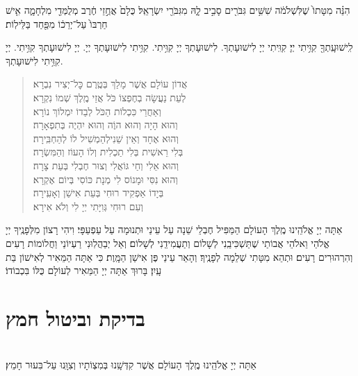 \documentclass[twoside, openany, parskip=half, 11pt]{book}
\begin{document}
הִנֵּ֗ה מִטָּתוֹ֙ שֶׁלִּשְׁלֹמֹ֔ה שִׁשִּׁ֥ים גִּבֹּרִ֖ים סָבִ֣יב לָ֑הּ מִגִּבֹּרֵ֖י יִשְׂרָאֵֽל׃ כֻּלָם֙ אֲחֻ֣זֵי חֶ֔רֶב מְלֻמְּדֵ֖י מִלְחָמָ֑ה אִ֤ישׁ חַרְבּוֹ֙ עַל־יְרֵכ֔וֹ מִפַּ֖חַד בַּלֵּילֽוֹת׃


לִֽישׁוּעָֽתְךָ֖ קִוִּ֥יתִי יְיָ׃ קִוִּֽיתִי יְיָ לִישׁוּעָתְךָ. לִישׁוּעָתְךָ יְיָ קִוִּ֥יתִי. קִוִּ֥יתִי לִישׁוּעָתְךָ יְיָ. יְיָ לִישׁוּעָתְךָ קִוִּ֥יתִי. יְיָ קִוִּ֥יתִי לִישׁוּעָתְךָ.

\vspace{-\baselineskip}
\begin{quote}

אֲדוֹן עוֹלָם אֲשֶׁר מָלַךְ \hfill בְּטֶֽרֶם כׇּל־יְצִיר נִבְרָא׃\\
לְעֵת נַעֲשָׂה בְחֶפְצוֹ כֹּל \hfill אֲזַי מֶֽלֶךְ שְׁמוֹ נִקְרָא׃\\
וְאַחֲרֵי כִּכְלוֹת הַכֹּל \hfill לְבַדוֹ יִמְלוֹךְ נוֹרָא׃\\
וְהוּא הָיָה וְהוּא הוֶֹה \hfill וְהוּא יִהְיֶה בְּתִפְאָרָה׃\\
וְהוּא אֶחָד וְאֵין שֵׁנִי\hfill לְהַמְשִׁיל לוֹ לְהַחְבִּֽירָה׃\\
בְּלִי רֵאשִׁית בְּלִי תַכְלִית \hfill וְלוֹ הָעוֹז וְהַמִּשְׂרָה׃\\
וְהוּא אֵלִי וְחַי גּוֹאֲלִי \hfill וְצוּר חֶבְלִי בְּעֵת צָרָה׃\\
וְהוּא נִסִּי וּמָנוֹס לִי \hfill מְנָת כּוֹסִי בְּיוֹם אֶקְרָא׃\\
בְּיָדוֹ אַפְקִיד רוּחִי \hfill בְּעֵת אִישַׁן וְאָעִֽירָה׃\\
וְעִם רוּחִי גְּוִיָּתִי \hfill יְיָ לִי וְלֹא אִירָא׃

\end{quote}


אַתָּה יְיָ אֱלֹהֵֽינוּ מֶֽלֶךְ הָעוֹלָם הַמַּפִּיל חֶבְלֵי שֵׁנָה עַל עֵינַי וּתְנוּמָה עַל עַפְעַפָּי׃ וִיהִי רָצוֹן מִלְּפָנֶֽיךָ יְיָ אֱלֹהַי וֵאלֹהֵי אֲבוֹתַי שֶׁתַּשְׁכִּיבֵֽנִי לְשָׁלוֹם וְתַעֲמִידֵֽנִי לְשָׁלוֹם׃ וְאַל יְבַהֲלֽוּנִי רַעְיוֹנַי וַחֲלוֹמוֹת רָעִים וְהִרְהוּרִים רָעִים׃ וּתְהֵא מִטָּתִי שְׁלֵמָה לְפָנֶֽיךָ׃ וְהָאֵר עֵינַי פֶּן אִישַׁן הַמָּֽוֶת׃ כִּי אַתָּה הַמֵּאִיר לְאִישׁוֹן בַּת עָֽיִן׃ בָּרוּךְ אַתָּה יְיָ הַמֵּאִיר לְעוֹלָם כֻּלּוֹ בִּכְבוֹדוֹ׃


\chapter[בדיקת וביטול חמץ]{ בדיקת וביטול חמץ }

\\
אַתָּה יְיָ אֱלֹהֵֽינוּ מֶֽלֶךְ הָעוֹלָם אֲשֶׁר קִדְּשָֽׁנוּ בְּמִצְוֹתָיו וְצִוָּֽנוּ עַל־בִּעוּר חָמֵץ׃
\end{document}
